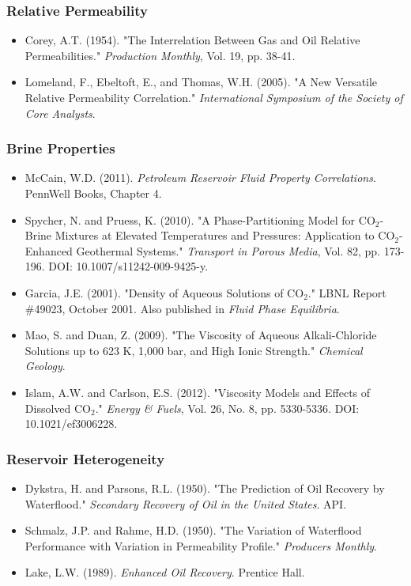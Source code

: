 \documentclass[11pt,a4paper]{article}
\begin{document}
\subsubsection{Relative Permeability}
\begin{itemize}
\item Corey, A.T. (1954). "The Interrelation Between Gas and Oil Relative Permeabilities." \textit{Production Monthly}, Vol. 19, pp. 38-41.
\item Lomeland, F., Ebeltoft, E., and Thomas, W.H. (2005). "A New Versatile Relative Permeability Correlation." \textit{International Symposium of the Society of Core Analysts}.
\end{itemize}

\subsubsection{Brine Properties}
\begin{itemize}
\item McCain, W.D. (2011). \textit{Petroleum Reservoir Fluid Property Correlations}. PennWell Books, Chapter 4.
\item Spycher, N. and Pruess, K. (2010). "A Phase-Partitioning Model for CO$_2$-Brine Mixtures at Elevated Temperatures and Pressures: Application to CO$_2$-Enhanced Geothermal Systems." \textit{Transport in Porous Media}, Vol. 82, pp. 173-196. DOI: 10.1007/s11242-009-9425-y.
\item Garcia, J.E. (2001). "Density of Aqueous Solutions of CO$_2$." LBNL Report \#49023, October 2001. Also published in \textit{Fluid Phase Equilibria}.
\item Mao, S. and Duan, Z. (2009). "The Viscosity of Aqueous Alkali-Chloride Solutions up to 623 K, 1,000 bar, and High Ionic Strength." \textit{Chemical Geology}.
\item Islam, A.W. and Carlson, E.S. (2012). "Viscosity Models and Effects of Dissolved CO$_2$." \textit{Energy \& Fuels}, Vol. 26, No. 8, pp. 5330-5336. DOI: 10.1021/ef3006228.
\end{itemize}

\subsubsection{Reservoir Heterogeneity}
\begin{itemize}
\item Dykstra, H. and Parsons, R.L. (1950). "The Prediction of Oil Recovery by Waterflood." \textit{Secondary Recovery of Oil in the United States}. API.
\item Schmalz, J.P. and Rahme, H.D. (1950). "The Variation of Waterflood Performance with Variation in Permeability Profile." \textit{Producers Monthly}.
\item Lake, L.W. (1989). \textit{Enhanced Oil Recovery}. Prentice Hall.
\end{itemize}
\end{document}
